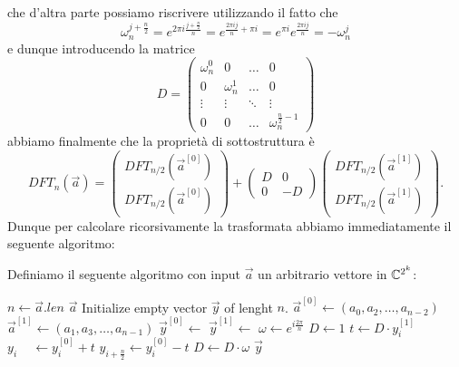 \documentclass[11pt]{scrartcl}
\begin{document}
	che d'altra parte possiamo riscrivere utilizzando il fatto che 
	$$\omega^{j+\frac{n}{2}}_n=e^{2\pi i\frac{ j +\frac{n}{2}}{n}}=e^{\frac{2\pi ij}{n}+\pi i}=e^{\pi i}e^{\frac{2\pi ij}{n}}=-\omega^{j}_n$$
	e dunque introducendo la matrice 
	$$
	D=
	\begin{pmatrix}
		\omega_n^{0} & 0 & \dots & 0 \\
		0 & \omega_n^{1} & \dots & 0 \\
		\vdots & \vdots  & \ddots& \vdots \\
		0 & 0 & \dots & \omega_n^{\frac{n}{2}-1}
	\end{pmatrix}
	$$
	abbiamo finalmente che la proprietà di sottostruttura è
	$$
	DFT_n(\vec{a})=
	\left(
	\begin{array}{c}
		DFT_{n/2}\left(\vec{a}^{[0]}\right) \\
		\hline
		DFT_{n/2}\left(\vec{a}^{[0]}\right)
	\end{array}
	\right)
	+
	\left(
	\begin{array}{c|c}
		D & 0 \\
		\hline
		0 & -D
	\end{array}
	\right)
	\left(
	\begin{array}{c}
		DFT_{n/2}\left(\vec{a}^{[1]}\right) \\
		\hline
		DFT_{n/2}\left(\vec{a}^{[1]}\right)
	\end{array}
	\right).
	$$
	Dunque per calcolare ricorsivamente la trasformata abbiamo immediatamente il seguente algoritmo:
	\begin{algorithm}
		Definiamo il seguente algoritmo con input $\vec{a}$ un arbitrario vettore in $\mathbb C^{2^k}$:
		\begin{algorithmic}[1]
				\State $n\gets \vec{a}.len$
					\State \Return $\vec{a}$
				\EndIf
				\State Initialize empty vector $\vec{y}$ of lenght $n$.
				\State $\vec{a}^{[0]}\gets (a_0,a_2,\dots,a_{n-2})$
				\State $\vec{a}^{[1]}\gets (a_1,a_3,\dots,a_{n-1})$
				\State $\vec{y}^{[0]}\gets$
				\State $\vec{y}^{[1]}\gets$
				\State $\omega\gets e^{i\frac{2\pi}{n}}$
				\State $D\gets 1$
					\State $t \gets D\cdot y_i^{[1]}$ 
					\State $y_i \,\quad  \gets y_i^{[0]}+t$
					\State $y_{i+\frac{n}{2}} \gets y_i^{[0]}-t$
					\State $D\gets D\cdot\omega$
				\EndFor
				\State \Return $\vec{y}$
			\EndFunction
		\end{algorithmic} 
	\end{algorithm}
\end{document}

